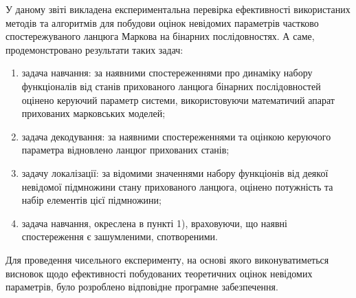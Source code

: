 У даному звіті викладена експериментальна перевірка ефективності використаних методів та алгоритмів для побудови оцінок невідомих параметрів частково спостережуваного ланцюга Маркова на бінарних послідовностях. А саме, продемонстровано результати таких задач:

\begin{enumerate}
    \item задача навчання: за наявними спостереженнями про динаміку набору функціоналів від станів прихованого ланцюга бінарних послідовностей оцінено керуючий параметр системи, використовуючи математичий апарат прихованих марковських моделей;
    \item задача декодування: за наявними спостереженнями та оцінкою керуючого параметра відновлено ланцюг прихованих станів;
    \item задачу локалізації: за відомими значеннями набору функціонів від деякої невідомої підмножини стану прихованого ланцюга, оцінено потужність та набір елементів цієї підмножини;
    \item задача навчання, окреслена в пункті 1), враховуючи, що наявні спостереження є зашумленими, спотвореними.
\end{enumerate}

Для проведення чисельного експерименту, на основі якого виконуватиметься висновок щодо ефективності побудованих теоретичних оцінок невідомих параметрів, було розроблено відповідне програмне забезпечення.